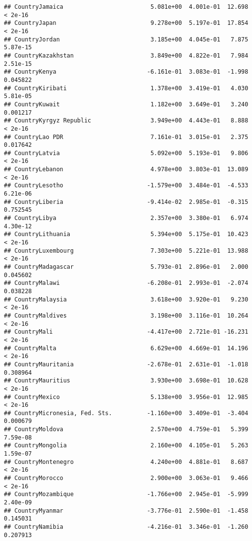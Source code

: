 \documentclass[
]{article}
\begin{document}
\begin{verbatim}
## CountryJamaica                         5.081e+00  4.001e-01  12.698  < 2e-16
## CountryJapan                           9.278e+00  5.197e-01  17.854  < 2e-16
## CountryJordan                          3.185e+00  4.045e-01   7.875 5.87e-15
## CountryKazakhstan                      3.849e+00  4.822e-01   7.984 2.51e-15
## CountryKenya                          -6.161e-01  3.083e-01  -1.998 0.045822
## CountryKiribati                        1.378e+00  3.419e-01   4.030 5.81e-05
## CountryKuwait                          1.182e+00  3.649e-01   3.240 0.001217
## CountryKyrgyz Republic                 3.949e+00  4.443e-01   8.888  < 2e-16
## CountryLao PDR                         7.161e-01  3.015e-01   2.375 0.017642
## CountryLatvia                          5.092e+00  5.193e-01   9.806  < 2e-16
## CountryLebanon                         4.978e+00  3.803e-01  13.089  < 2e-16
## CountryLesotho                        -1.579e+00  3.484e-01  -4.533 6.21e-06
## CountryLiberia                        -9.414e-02  2.985e-01  -0.315 0.752545
## CountryLibya                           2.357e+00  3.380e-01   6.974 4.30e-12
## CountryLithuania                       5.394e+00  5.175e-01  10.423  < 2e-16
## CountryLuxembourg                      7.303e+00  5.221e-01  13.988  < 2e-16
## CountryMadagascar                      5.793e-01  2.896e-01   2.000 0.045602
## CountryMalawi                         -6.208e-01  2.993e-01  -2.074 0.038228
## CountryMalaysia                        3.618e+00  3.920e-01   9.230  < 2e-16
## CountryMaldives                        3.198e+00  3.116e-01  10.264  < 2e-16
## CountryMali                           -4.417e+00  2.721e-01 -16.231  < 2e-16
## CountryMalta                           6.629e+00  4.669e-01  14.196  < 2e-16
## CountryMauritania                     -2.678e-01  2.631e-01  -1.018 0.308964
## CountryMauritius                       3.930e+00  3.698e-01  10.628  < 2e-16
## CountryMexico                          5.138e+00  3.956e-01  12.985  < 2e-16
## CountryMicronesia, Fed. Sts.          -1.160e+00  3.409e-01  -3.404 0.000679
## CountryMoldova                         2.570e+00  4.759e-01   5.399 7.59e-08
## CountryMongolia                        2.160e+00  4.105e-01   5.263 1.59e-07
## CountryMontenegro                      4.240e+00  4.881e-01   8.687  < 2e-16
## CountryMorocco                         2.900e+00  3.063e-01   9.466  < 2e-16
## CountryMozambique                     -1.766e+00  2.945e-01  -5.999 2.40e-09
## CountryMyanmar                        -3.776e-01  2.590e-01  -1.458 0.145031
## CountryNamibia                        -4.216e-01  3.346e-01  -1.260 0.207913

\end{verbatim}
\end{document}
